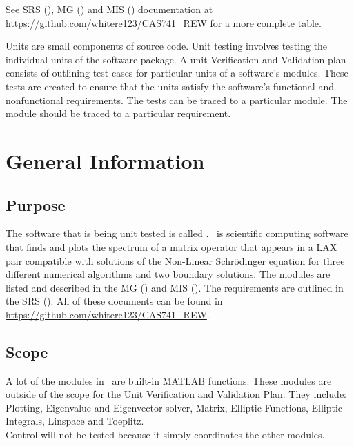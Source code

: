 \documentclass[12pt, titlepage]{article}
\begin{document}
See SRS (\cite{SRS}), MG (\cite{MG}) and MIS (\cite{MIS}) documentation at 
\url{https://github.com/whitere123/CAS741_REW} for a more complete table. 

\newpage


Units are small components of source code. Unit testing involves testing 
the individual units of the software package.  A unit Verification and 
Validation plan consists of outlining test cases for particular units of a 
software's modules. These tests are created to ensure that the units satisfy 
the software's functional and nonfunctional requirements. The tests can be 
traced to a particular module. The module should be traced to a particular 
requirement. 

\section{General Information}

\subsection{Purpose}

The software that is being unit tested is called \progname. \progname \ is 
scientific computing software that finds and plots the spectrum of a matrix 
operator that appears in a LAX pair compatible with solutions of the Non-Linear 
Schr\"{o}dinger equation for three different numerical algorithms and two 
boundary solutions. The modules are listed and described in the MG (\cite{MG}) 
and 
MIS (\cite{MIS}). The requirements are outlined in the SRS (\cite{SRS}). All of 
these documents can be 
found in \url{https://github.com/whitere123/CAS741_REW}. 

\subsection{Scope}

A lot of the modules in \progname \ are built-in MATLAB functions. These 
modules 
are outside of the scope for the Unit Verification and Validation Plan. They 
include: Plotting, Eigenvalue and Eigenvector solver, Matrix, Elliptic 
Functions, Elliptic Integrals, Linspace and Toeplitz.\\  
Control will not be tested because it simply coordinates the other
modules. 
\end{document}

